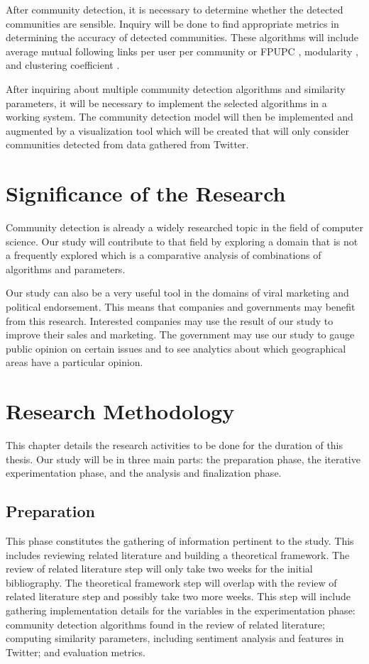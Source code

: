 After community detection, it is necessary to determine whether the detected communities are sensible. Inquiry will be done to find appropriate metrics in determining the accuracy of detected communities. These algorithms will include average mutual following links per user per community or FPUPC \cite{Zhang:2012}, modularity \cite{Deitrick:2013}, and clustering coefficient \cite{Lim:2012:1}.


After inquiring about multiple community detection algorithms and similarity parameters, it will be necessary to implement the selected algorithms in a working system. The community detection model will then be implemented and augmented by a visualization tool which will be created that will only consider communities detected from data gathered from Twitter.


\section{Significance of the Research}
\label{sec:significance}


Community detection is already a widely researched topic in the field of computer science. Our study will contribute to that field by exploring a domain that is not a frequently explored which is a comparative analysis of combinations of algorithms and parameters.


Our study can also be a very useful tool in the domains of viral marketing and political endorsement. This means that companies and governments may benefit from this research. Interested companies may use the result of our study to improve their sales and marketing. The government may use our study to gauge public opinion on certain issues and to see analytics about which geographical areas have a particular opinion. 


\section{Research Methodology}
This chapter details the research activities to be done for the duration of this thesis. Our study will be in three main parts: the preparation phase, the iterative experimentation phase, and the analysis and finalization phase.


\subsection{Preparation}


This phase constitutes the gathering of information pertinent to the study. This includes reviewing related literature and building a theoretical framework. The review of related literature step will only take two weeks for the initial bibliography. The theoretical framework step will overlap with the review of related literature step and possibly take two more weeks. This step will include gathering implementation details for the variables in the experimentation phase: community detection algorithms found in the review of related literature; computing similarity parameters, including sentiment analysis and features in Twitter; and evaluation metrics. 


